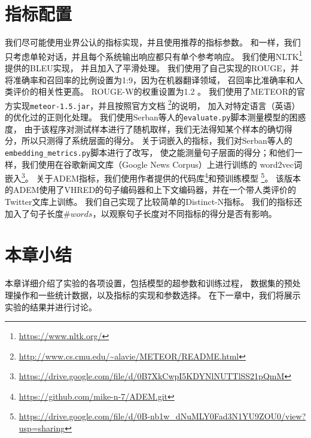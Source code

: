 \section{指标配置}\label{sec:metric_config}
我们尽可能使用业界公认的指标实现，并且使用推荐的指标参数。
和\cite{HowNot}一样，我们只考虑单轮对话，并且每个系统输出响应都只有单个参考响应。
我们使用NLTK\footnote{\url{https://www.nltk.org/}}提供的BLEU实现， 并且加入了平滑处理。
我们使用了自己实现的ROUGE，并将准确率和召回率的比例设置为1:9，因为在机器翻译领域，
召回率比准确率和人类评价的相关性更高。
ROUGE-W的权重设置为1.2 。
我们使用了METEOR的官方实现\texttt{meteor-1.5.jar}，并且按照官方文档
\footnote{\url{http://www.cs.cmu.edu/~alavie/METEOR/README.html}}的说明，
加入对特定语言（英语）的优化过的正则化处理。
我们使用Serban等人的\texttt{evaluate.py}脚本测量模型的困惑度，
由于该程序对测试样本进行了随机取样，我们无法得知某个样本的确切得分，所以只测得了系统层面的得分。
关于词嵌入的指标，我们对Serban等人的\texttt{embedding\_metrics.py}脚本进行了改写，
使之能测量句子层面的得分；和他们一样，我们使用在谷歌新闻文库（Google News Corpus）上进行训练的
word2vec词嵌入\footnote{\url{https://drive.google.com/file/d/0B7XkCwpI5KDYNlNUTTlSS21pQmM}}。
关于ADEM指标，我们使用作者提供的代码库\footnote{\url{https://github.com/mike-n-7/ADEM.git}}和预训练模型
\footnote{\url{https://drive.google.com/file/d/0B-nb1w_dNuMLY0Fad3N1YU9ZOU0/view?usp=sharing}}。
该版本的ADEM使用了VHRED的句子编码器和上下文编码器，并在一个带人类评价的Twitter文库上训练。
我们自己实现了比较简单的Distinct-N指标。
我们的指标还加入了句子长度$\textit{\#words}$，以观察句子长度对不同指标的得分是否有影响。

\section{本章小结}\label{sec:method_conclusion}
本章详细介绍了实验的各项设置，包括模型的超参数和训练过程，
数据集的预处理操作和一些统计数据，以及指标的实现和参数选择。
在下一章中，我们将展示实验的结果并进行讨论。

